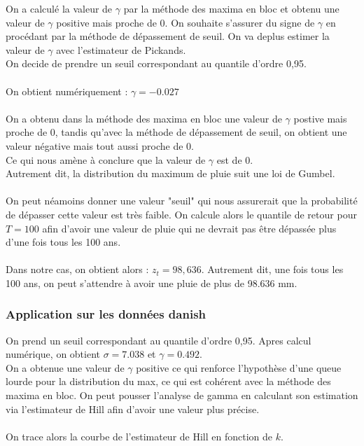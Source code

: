 \documentclass{article}
\theoremstyle{plain}
\theoremstyle{definition}
\theoremstyle{plain}
\begin{document}
On a calculé la valeur de $\gamma$ par la méthode des maxima en bloc et obtenu une valeur de $\gamma $ positive mais proche de 0. On souhaite s'assurer du signe de $\gamma$
en procédant par la méthode de dépassement de seuil. On va deplus estimer la valeur de $\gamma$ avec l'estimateur de Pickands.
\\
On decide de prendre un seuil correspondant au quantile d’ordre 0,95.
\\
\\
On obtient numériquement : 
$\gamma  = -0.027$
\\
\\
On a obtenu dans la méthode des maxima en bloc une valeur de $\gamma$ postive mais proche de 0,
tandis qu'avec la méthode de dépassement de seuil, on obtient une valeur négative mais tout aussi proche de 0.
\\
Ce qui nous amène à conclure que la valeur de $\gamma$ est de 0.
\\
Autrement dit, la distribution du maximum de pluie suit une loi de Gumbel.
\\
\\
On peut néamoins donner une valeur "seuil" qui nous assurerait que la probabilité de dépasser cette valeur est très faible. 
On calcule alors le quantile de retour pour $T=100$ afin d'avoir une valeur de pluie qui ne devrait pas être dépassée plus d'une fois tous les 100 ans.
\\
\\
Dans notre cas, on obtient alors : $z_t = 98,636$. Autrement dit, une fois tous les 100 ans, on peut s'attendre à avoir une pluie de plus de 98.636 mm.

\subsubsection{Application sur les données danish}

On prend un seuil correspondant au quantile d’ordre 0,95. Apres calcul numérique, on obtient $\sigma = 7.038$ et $\gamma = 0.492$.
\\
On a obtenue une valeur de $\gamma$ positive ce qui renforce l'hypothèse d'une queue lourde pour la distribution du max, ce qui est cohérent avec la méthode des maxima en bloc. On peut pousser l'analyse de gamma en calculant son estimation via l'estimateur de Hill afin d'avoir une valeur plus précise.
\\
\\
On trace alors la courbe de l'estimateur de Hill en fonction de $k$.
\end{document}
